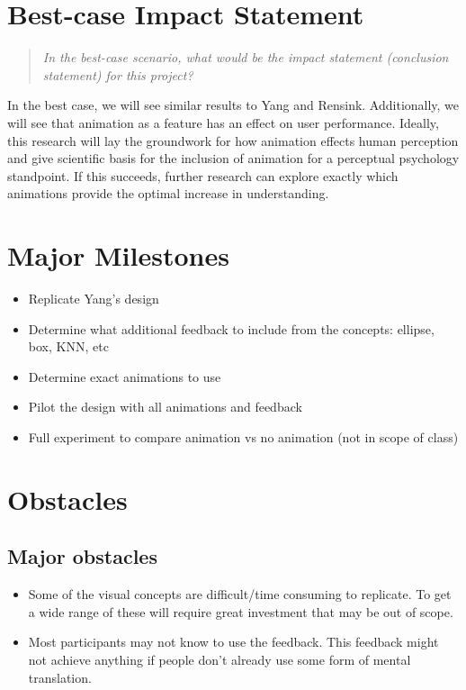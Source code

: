 \documentclass{proc}
\begin{document}
	\section{Best-case Impact Statement}
	\begin{quote}
		\textit{In the best-case scenario, what would be the impact statement (conclusion statement) for this project? }
	\end{quote}
		In the best case, we will see similar results to Yang and Rensink. Additionally, we will see that animation as a feature has an effect on user performance. Ideally, this research will lay the groundwork for how animation effects human perception and give scientific basis for the inclusion of animation for a perceptual psychology standpoint. 
		If this succeeds, further research can explore exactly which animations provide the optimal increase in understanding. 
	\section{Major Milestones}
	\begin{itemize}
		\item Replicate Yang's design
		\item Determine what additional feedback to include from the concepts: ellipse, box, KNN, etc
		\item Determine exact animations to use
		\item Pilot the design with all animations and feedback
		\item Full experiment to compare animation vs no animation (not in scope of class)
	\end{itemize}
	\section{Obstacles}
	
	\subsection{Major obstacles} %
	\begin{itemize}
		\item Some of the visual concepts are difficult/time consuming to replicate. To get a wide range of these will require great investment that may be out of scope.
		\item Most participants may not know to use the feedback. This feedback might not achieve anything if people don't already use some form of mental translation.
	\end{itemize}
\end{document}
